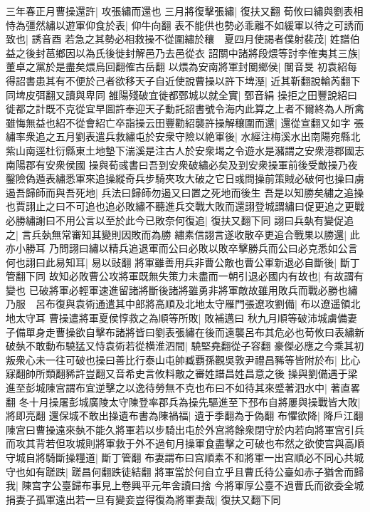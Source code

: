三年春正月曹操還許|{
	攻張繡而還也}
三月將復擊張繡|{
	復扶又翻}
荀攸曰繡與劉表相恃為彊然繡以遊軍仰食於表|{
	仰牛向翻}
表不能供也勢必乖離不如緩軍以待之可誘而致也|{
	誘音酉}
若急之其勢必相救操不從圍繡於穰　夏四月使謁者僕射裴茂|{
	姓譜伯益之後封䓃鄉因以為氏後徙封解邑乃去邑從衣}
詔關中諸將段煨等討李傕夷其三族|{
	董卓之黨於是盡矣煨烏回翻傕古岳翻}
以煨為安南將軍封閺鄉侯|{
	閺音旻}
初袁紹每得詔書患其有不便於己者欲移天子自近使說曹操以許下埤溼|{
	近其靳翻說輸芮翻下同埤皮弭翻又讀與卑同}
雒陽殘破宜徙都鄄城以就全實|{
	鄄音絹}
操拒之田豐說紹曰徙都之計既不克從宜早圖許奉迎天子動託詔書號令海内此算之上者不爾終為人所禽雖悔無益也紹不從會紹亡卒詣操云田豐勸紹襲許操解穰圍而還|{
	還從宣翻又如字}
張繡率衆追之五月劉表遣兵救繡屯於安衆守險以絶軍後|{
	水經注梅溪水出南陽宛縣北紫山南逕杜衍縣東土地墊下湍溪是注古人於安衆堨之令遊水是瀦謂之安衆港郡國志南陽郡有安衆侯國}
操與荀彧書曰吾到安衆破繡必矣及到安衆操軍前後受敵操乃夜鑿險偽遁表繡悉軍來追操縱奇兵步騎夾攻大破之它日彧問操前策賊必破何也操曰虜遏吾歸師而與吾死地|{
	兵法曰歸師勿遏又曰置之死地而後生}
吾是以知勝矣繡之追操也賈詡止之曰不可追也追必敗繡不聽進兵交戰大敗而還詡登城謂繡曰促更追之更戰必勝繡謝曰不用公言以至於此今已敗奈何復追|{
	復扶又翻下同}
詡曰兵埶有變促追之|{
	言兵埶無常審知其變則因敗而為勝}
繡素信詡言遂收散卒更追合戰果以勝還|{
	此亦小勝耳}
乃問詡曰繡以精兵追退軍而公曰必敗以敗卒擊勝兵而公曰必克悉如公言何也詡曰此易知耳|{
	易以䜴翻}
將軍雖善用兵非曹公敵也曹公軍新退必自斷後|{
	斷丁管翻下同}
故知必敗曹公攻將軍既無失策力未盡而一朝引退必國内有故也|{
	有故謂有變也}
已破將軍必輕軍速進留諸將斷後諸將雖勇非將軍敵故雖用敗兵而戰必勝也繡乃服　呂布復與袁術通遣其中郎將高順及北地太守雁門張遼攻劉備|{
	布以遼遥領北地太守耳}
曹操遣將軍夏侯惇救之為順等所敗|{
	敗補邁曰}
秋九月順等破沛城虜備妻子備單身走曹操欲自擊布諸將皆曰劉表張繡在後而遠襲呂布其危必也荀攸曰表繡新破埶不敢動布驍猛又恃袁術若從横淮泗間|{
	驍堅堯翻從子容翻}
豪傑必應之今乘其初叛衆心未一往可破也操曰善比行泰山屯帥臧覇孫觀吳敦尹禮昌豨等皆附於布|{
	比心寐翻帥所類翻豨許豈翻又音希史言攸料敵之審姓譜昌姓昌意之後}
操與劉備遇于梁進至彭城陳宫謂布宜逆擊之以逸待勞無不克也布曰不如待其來蹙著泗水中|{
	著直畧翻}
冬十月操屠彭城廣陵太守陳登率郡兵為操先驅進至下邳布自將屢與操戰皆大敗|{
	將即亮翻}
還保城不敢出操遺布書為陳禍福|{
	遺于季翻為于偽翻}
布懼欲降|{
	降戶江翻}
陳宫曰曹操遠來埶不能久將軍若以步騎出屯於外宫將餘衆閉守於内若向將軍宫引兵而攻其背若但攻城則將軍救于外不過旬月操軍食盡擊之可破也布然之欲使宫與高順守城自將騎斷操糧道|{
	斷丁管翻}
布妻謂布曰宫順素不和將軍一出宫順必不同心共城守也如有蹉跌|{
	蹉昌何翻跌徒結翻}
將軍當於何自立乎且曹氏待公臺如赤子猶舍而歸我|{
	陳宫字公臺歸布事見上卷興平元年舍讀曰捨}
今將軍厚公臺不過曹氏而欲委全城捐妻子孤軍遠出若一旦有變妾豈得復為將軍妻哉|{
	復扶又翻下同}
